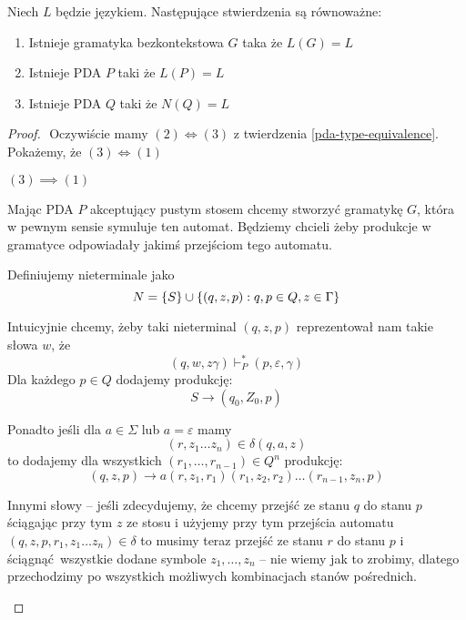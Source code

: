 \begin{theorem}
	Niech \( L \) będzie językiem. Następujące stwierdzenia są równoważne:
	\begin{enumerate}
		\item Istnieje gramatyka bezkontekstowa \( G \) taka że \( L(G) = L \)
		\item Istnieje PDA \( P \) taki że \( L(P) = L \)
		\item Istnieje PDA \( Q \) taki że \( N(Q) = L \)
	\end{enumerate}
\end{theorem}
\begin{proof} \( \)
	Oczywiście mamy \( (2) \iff (3) \) z twierdzenia \ref{pda-type-equivalence}.
	Pokażemy, że \( (3) \iff (1) \)


	\begin{description}


		\item \( (3) \implies (1) \)

		      Mając PDA \( P \) akceptujący pustym stosem chcemy stworzyć gramatykę \( G \), która w pewnym sensie symuluje ten automat. Będziemy chcieli żeby produkcje w gramatyce odpowiadały jakimś przejściom tego automatu.

		      Definiujemy nieterminale jako
		      \[ N = \set{S} \cup\set{(q, z, p) : q, p \in Q, z \in \Gamma} \]

		      Intuicyjnie chcemy, żeby taki nieterminal \( (q, z, p) \) reprezentował nam takie słowa \( w \), że
		      \[
			      (q, w, z\gamma) \vdash_P^* (p, \varepsilon, \gamma)
		      \]
		      Dla każdego \( p \in Q \) dodajemy produkcję:
		      \[
			      S \rightarrow (q_0, Z_0, p)
		      \]

		      Ponadto jeśli dla \( a \in \Sigma \) lub \( a = \varepsilon \) mamy
		      \[
			      (r, z_1 \dots z_n) \in \delta(q, a, z)
		      \]
		      to dodajemy dla wszystkich \( (r_1, \dots, r_{n-1}) \in Q^n \) produkcję:
		      \[
			      (q, z, p) \rightarrow a(r, z_1, r_1)(r_1, z_2, r_2)\dots(r_{n-1}, z_n, p)
		      \]

		      Innymi słowy -- jeśli zdecydujemy, że chcemy przejść ze stanu \( q \) do stanu \( p \) ściągając przy tym \( z \) ze stosu i użyjemy przy tym
		      przejścia automatu \( (q, z, p, r_1, z_1\dots z_n) \in \delta \)
		      to musimy teraz przejść ze stanu \( r \) do stanu \( p \) i ściągnąć wszystkie dodane symbole \( z_1, \dots, z_n \) -- nie wiemy jak to zrobimy, dlatego przechodzimy po wszystkich możliwych kombinacjach stanów pośrednich.


\end{description}
\end{proof}
